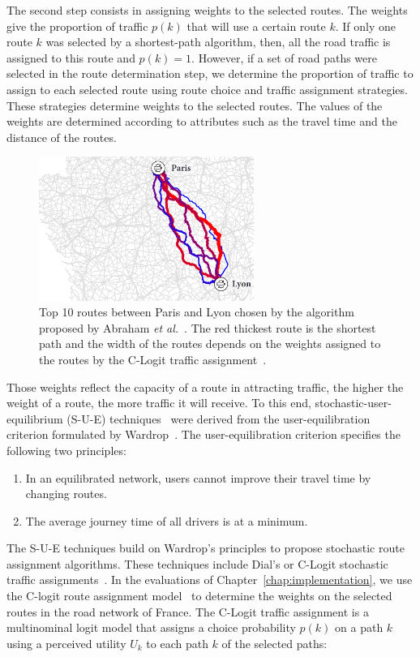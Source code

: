 The second step consists in assigning weights to the selected routes. The weights give the proportion of traffic $p(k)$ that will use a certain route $k$. If only one route $k$ was selected by a shortest-path algorithm, then, all the road traffic is assigned to this route and $p(k) = 1$. However, if a set of road paths were selected in the route determination step, we determine the proportion of traffic to assign to each selected route using route choice and traffic assignment strategies. These strategies determine weights to the selected routes. The values of the weights are determined according to attributes such as the travel time and the distance of the routes. 
\begin{figure}
    \includegraphics[width=7cm]{figures/route-assignment.pdf}
    \caption{Top 10 routes between Paris and Lyon chosen by the algorithm proposed by Abraham \textit{et al.}~\cite{abraham2013alternative}. The red thickest route is the shortest path and the width of the routes depends on the weights assigned to the routes by the C-Logit traffic assignment~\cite{cascetta1996modified}.}
    \label{fig:route-assignment}
\end{figure}
Those weights reflect the capacity of a route in attracting traffic, the higher the weight of a route, the more traffic it will receive. To this end, stochastic-user-equilibrium (S-U-E) techniques~\cite{daganzo1977stochastic} were derived from the user-equilibration criterion formulated by Wardrop~\cite{wardrop1952some}. The user-equilibration criterion specifies the following two principles:
\begin{enumerate}
    \item In an equilibrated network, users cannot improve their travel time by changing routes.
    \item The average journey time of all drivers is at a minimum.
\end{enumerate}
The S-U-E techniques build on Wardrop's principles to propose stochastic route assignment algorithms. These techniques include Dial's or C-Logit stochastic traffic assignments~\cite{dial1971probabilistic,cascetta1996modified}.  In the evaluations of Chapter~\ref{chap:implementation}, we use the C-logit route assignment model~\cite{cascetta1996modified} to determine the weights on the selected routes in the road network of France. The C-Logit traffic assignment is a multinominal logit model that assigns a choice probability $p(k)$ on a path $k$ using a perceived utility $U_k$ to each path $k$ of the selected paths:
